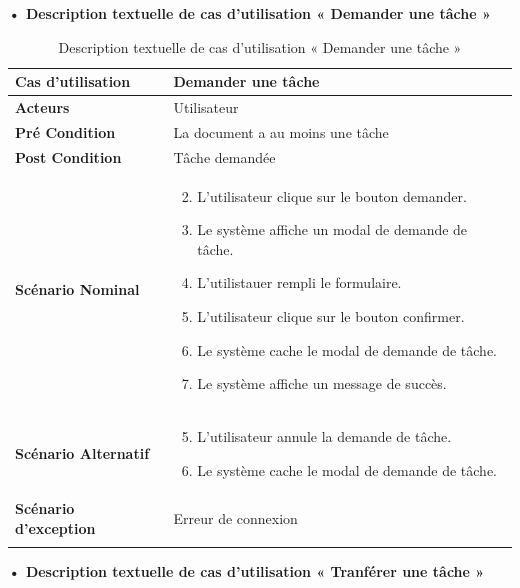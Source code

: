 \textbf{•	Description textuelle de cas d'utilisation « Demander une tâche »}

\begin{longtable}{|p{5cm}|p{10cm}|}
\hline
\textbf{Cas d'utilisation}&Demander une tâche\\
\hline
\textbf{Acteurs}&Utilisateur\\
\hline
\textbf{Pré Condition}&La document a au moins une tâche\\
\hline
\textbf{Post Condition}&Tâche demandée\\
\hline
\textbf{Scénario Nominal}&
\vspace{-\baselineskip}
\begin{enumerate}
    \setcounter{enumi}{1}
    \item L'utilisateur clique sur le bouton demander.
    \item Le système affiche un modal de demande de tâche.
    \item L'utilistauer rempli le formulaire.
    \item L'utilisateur clique sur le bouton confirmer.
    \item Le système cache le modal de demande de tâche.
    \item Le système affiche un message de succès.
\end{enumerate}\\
\hline
\textbf{Scénario Alternatif}&
\vspace{-\baselineskip}
\begin{enumerate}
    \setcounter{enumi}{4}
    \item L'utilisateur annule la demande de tâche.
    \item Le système cache le modal de demande de tâche.
\end{enumerate}\\
\hline
\textbf{Scénario d'exception}&Erreur de connexion\\
\hline
\caption{Description textuelle de cas d'utilisation « Demander une tâche »}
\label{tab:DescriptionTextuelleDeCasDUtilisationDemanderUneTache}
\end{longtable}


\textbf{•	Description textuelle de cas d'utilisation « Tranférer une tâche »}

